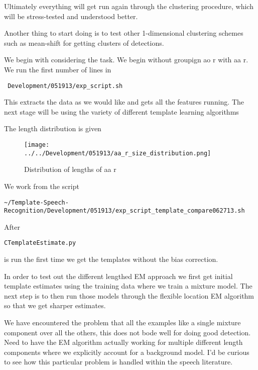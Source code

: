 \documentclass{article}
\begin{document}
Ultimately everything will get run again through the clustering procedure, which will be stress-tested and understood better.

Another thing to start doing is to test other 1-dimensional clustering schemes such as mean-shift for getting clusters of detections.


We begin with considering the task.  We begin without groupign ao r with aa r.
We run the first number of lines in  \begin{verbatim} Development/051913/exp_script.sh \end{verbatim}
This extracts the data as we would like and gets all the features running.
The next stage will be using the variety of different template learning algorithms

The length distribution is given 
\begin{figure}
  \centering

  \texttt{[image: ../../Development/051913/aa\_r\_size\_distribution.png]}
  
    \caption[.]{Distribution of lengths of aa r}
    \label{fig:display-length_distribution}
\end{figure}




We work from the script \begin{verbatim}~/Template-Speech-Recognition/Development/051913/exp_script_template_compare062713.sh\end{verbatim}

After \begin{verbatim}CTemplateEstimate.py\end{verbatim} is run the first time we get the templates without the bias correction.

In order to test out the different lengthed EM approach we first get initial
template estimates using the training data where we train a mixture model.
The next step is to then run those models through the flexible location EM
algorithm so that we get sharper estimates.

We have encountered the problem that all the examples like a single mixture component over all the others, this does not bode well for doing
good detection.  Need to have the EM algorithm actually working for
multiple different length components where we explicitly account for
a background model. I'd be curious to see how this particular problem is
handled within the speech literature.
\end{document}
